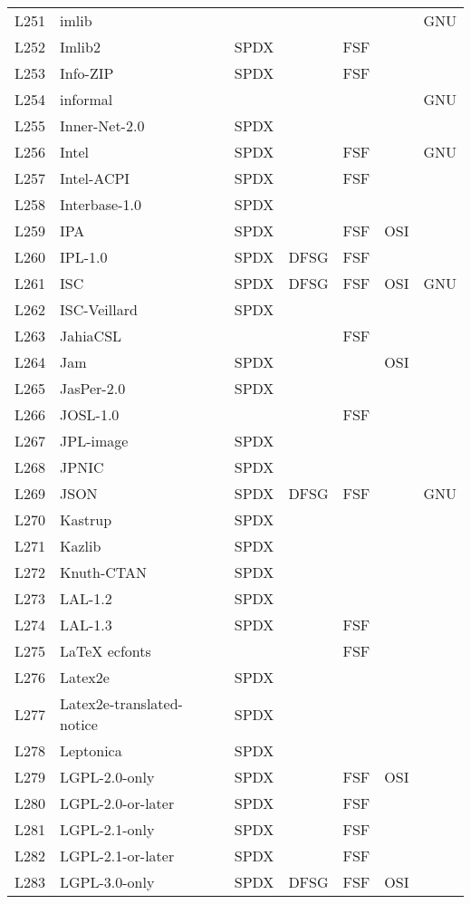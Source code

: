 \begin{longtable}[h]{m{2cm} | m{7cm} | c | c | c | c | c}
L251 & imlib &  &  &  &  & GNU \\
L252 & Imlib2 & SPDX &  & FSF &  &  \\
L253 & Info-ZIP & SPDX &  & FSF &  &  \\
L254 & informal &  &  &  &  & GNU \\
L255 & Inner-Net-2.0 & SPDX &  &  &  &  \\
L256 & Intel & SPDX &  & FSF &  & GNU \\
L257 & Intel-ACPI & SPDX &  & FSF &  &  \\
L258 & Interbase-1.0 & SPDX &  &  &  &  \\
L259 & IPA & SPDX &  & FSF & OSI &  \\
L260 & IPL-1.0 & SPDX & DFSG & FSF &  &  \\
L261 & ISC & SPDX & DFSG & FSF & OSI & GNU \\
L262 & ISC-Veillard & SPDX &  &  &  &  \\
L263 & JahiaCSL &  &  & FSF &  &  \\
L264 & Jam & SPDX &  &  & OSI &  \\
L265 & JasPer-2.0 & SPDX &  &  &  &  \\
L266 & JOSL-1.0 &  &  & FSF &  &  \\
L267 & JPL-image & SPDX &  &  &  &  \\
L268 & JPNIC & SPDX &  &  &  &  \\
L269 & JSON & SPDX & DFSG & FSF &  & GNU \\
L270 & Kastrup & SPDX &  &  &  &  \\
L271 & Kazlib & SPDX &  &  &  &  \\
L272 & Knuth-CTAN & SPDX &  &  &  &  \\
L273 & LAL-1.2 & SPDX &  &  &  &  \\
L274 & LAL-1.3 & SPDX &  & FSF &  &  \\
L275 & LaTeX ecfonts &  &  & FSF &  &  \\
L276 & Latex2e & SPDX &  &  &  &  \\
L277 & Latex2e-translated-notice & SPDX &  &  &  &  \\
L278 & Leptonica & SPDX &  &  &  &  \\
L279 & LGPL-2.0-only & SPDX &  & FSF & OSI &  \\
L280 & LGPL-2.0-or-later & SPDX &  & FSF &  &  \\
L281 & LGPL-2.1-only & SPDX &  & FSF &  &  \\
L282 & LGPL-2.1-or-later & SPDX &  & FSF &  &  \\
L283 & LGPL-3.0-only & SPDX & DFSG & FSF & OSI &  \\

\end{longtable}
